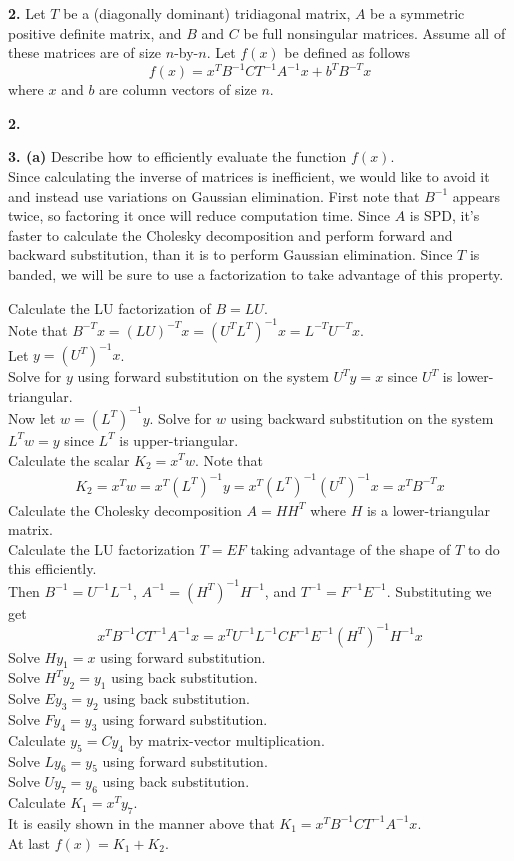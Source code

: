 \documentclass[12pt]{article}
\newcommand{\problem}[1]{\hspace{-4 ex} \large \textbf{#1}}
\begin{document}
\problem{2.} Let $T$ be a (diagonally dominant) tridiagonal matrix, $A$ be a symmetric positive definite matrix, and $B$ and $C$ be full nonsingular matrices. Assume all of these matrices are of size $n$-by-$n$. Let $f(x)$ be defined as follows $$f(x) = x^TB^{-1}CT^{-1}A^{-1}x + b^TB^{-T}x$$ where $x$ and $b$ are column vectors of size $n$.

\problem{2.} 
	
	
\problem{3. (a)} Describe how to efficiently evaluate the function $f(x)$. \\

	Since calculating the inverse of matrices is inefficient, we would like to avoid it and instead use variations on Gaussian elimination. First note that $B^{-1}$ appears twice, so factoring it once will reduce computation time. Since $A$ is SPD, it's faster to calculate the Cholesky decomposition and perform forward and backward substitution, than it is to perform Gaussian elimination. Since $T$ is banded, we will be sure to use a factorization to take advantage of this property. \bigbreak
	
	Calculate the LU factorization of $B = LU$. \\
	Note that $B^{-T}x = (LU)^{-T}x = (U^TL^T)^{-1}x = L^{-T}U^{-T}x$. \\
	Let $y = (U^T)^{-1}x$. \\
	Solve for $y$ using forward substitution on the system $U^Ty=x$ since $U^T$ is lower-triangular. \\
	Now let $w = (L^T)^{-1}y$. Solve for $w$ using backward substitution on the system $L^Tw=y$ since $L^T$ is upper-triangular. \\
	Calculate the scalar $K_2 = x^Tw$. Note that
	\begin{align*}
		K_2 = x^Tw = x^T(L^T)^{-1}y = x^T(L^T)^{-1}(U^T)^{-1}x = x^TB^{-T}x
	\end{align*}
	Calculate the Cholesky decomposition $A = HH^T$ where $H$ is a lower-triangular matrix. \\
	Calculate the LU factorization $T = EF$ taking advantage of the shape of $T$ to do this efficiently. \\
	Then $B^{-1} = U^{-1}L^{-1}$, $A^{-1}=(H^T)^{-1}H^{-1}$, and $T^{-1} = F^{-1}E^{-1}$. Substituting we get
	$$
	x^TB^{-1}CT^{-1}A^{-1}x = x^TU^{-1}L^{-1}CF^{-1}E^{-1}(H^T)^{-1}H^{-1}x
	$$
	Solve $Hy_1=x$ using forward substitution.\\
	Solve $H^Ty_2 = y_1$ using back substitution.\\
	Solve $E y_3 = y_2$ using back substitution. \\
	Solve $F y_4 = y_3$ using forward substitution. \\
	Calculate $y_5 = Cy_4$ by matrix-vector multiplication. \\
	Solve $L y_6 = y_5$ using forward substitution. \\
	Solve $U y_7 = y_6$ using back substitution. \\
	Calculate $K_1 = x^Ty_7$. \\
	It is easily shown in the manner above that $K_1 = x^TB^{-1}CT^{-1}A^{-1}x$.\\
	At last $f(x) = K_1 + K_2$.\\
\end{document}
